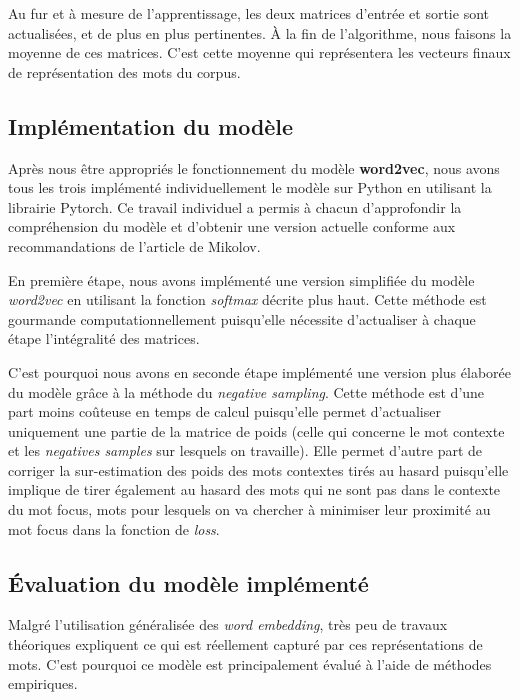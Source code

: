 \documentclass[11pt,french,french]{article}
\begin{document}
Au fur et à mesure de l'apprentissage, les deux matrices d'entrée et
sortie sont actualisées, et de plus en plus pertinentes. À la fin de
l'algorithme, nous faisons la moyenne de ces matrices. C'est cette
moyenne qui représentera les vecteurs finaux de représentation des mots
du corpus.

\subsection{Implémentation du
modèle}\label{impluxe9mentation-du-moduxe8le}

Après nous être appropriés le fonctionnement du modèle
\textbf{word2vec}, nous avons tous les trois implémenté individuellement
le modèle sur Python en utilisant la librairie Pytorch. Ce travail
individuel a permis à chacun d'approfondir la compréhension du modèle et
d'obtenir une version actuelle conforme aux recommandations de l'article
de Mikolov.

En première étape, nous avons implémenté une version simplifiée du
modèle \emph{word2vec} en utilisant la fonction \emph{softmax} décrite
plus haut. Cette méthode est gourmande computationnellement puisqu'elle
nécessite d'actualiser à chaque étape l'intégralité des matrices.

C'est pourquoi nous avons en seconde étape implémenté une version plus
élaborée du modèle grâce à la méthode du \emph{negative sampling}. Cette
méthode est d'une part moins coûteuse en temps de calcul puisqu'elle
permet d'actualiser uniquement une partie de la matrice de poids (celle
qui concerne le mot contexte et les \emph{negatives samples} sur
lesquels on travaille). Elle permet d'autre part de corriger la
sur-estimation des poids des mots contextes tirés au hasard puisqu'elle
implique de tirer également au hasard des mots qui ne sont pas dans le
contexte du mot focus, mots pour lesquels on va chercher à minimiser
leur proximité au mot focus dans la fonction de \emph{loss}.

\subsection{Évaluation du modèle
implémenté}\label{uxe9valuation-du-moduxe8le-impluxe9mentuxe9}

Malgré l'utilisation généralisée des \emph{word embedding}, très peu de
travaux théoriques expliquent ce qui est réellement capturé par ces
représentations de mots. C'est pourquoi ce modèle est principalement
évalué à l'aide de méthodes empiriques.
\end{document}
